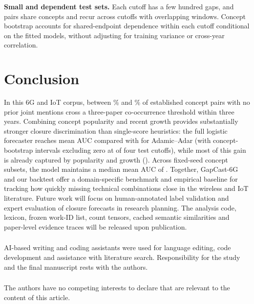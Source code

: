 \documentclass[runningheads]{llncs}
\newcommand{\bench}{GapCast-6G}
\begin{document}
\textbf{Small and dependent test sets.} Each cutoff has a few hundred gaps, and pairs share concepts and recur across cutoffs with overlapping windows. Concept bootstrap accounts for shared-endpoint dependence within each cutoff conditional on the fitted models, without adjusting for training variance or cross-year correlation.

\section{Conclusion}

In this 6G and IoT corpus, between \fillMin{}\% and \fillMax{}\% of established concept pairs with no prior joint mentions cross a three-paper co-occurrence threshold within three years. Combining concept popularity and recent growth provides substantially stronger closure discrimination than single-score heuristics: the full logistic forecaster reaches mean AUC \learnedAUC{} compared with \aaAUC{} for Adamic--Adar (with concept-bootstrap intervals excluding zero at \ciClAaExcludeW{} of four test cutoffs), while most of this gain is already captured by popularity and growth (\lrpgAUC{}). Across \subN{} fixed-seed concept subsets, the model maintains a median mean AUC of \subLearnedMed{}. Together, \bench{} and our backtest offer a domain-specific benchmark and empirical baseline for tracking how quickly missing technical combinations close in the wireless and IoT literature. Future work will focus on human-annotated label validation and expert evaluation of closure forecasts in research planning. The analysis code, lexicon, frozen work-ID list, count tensors, cached semantic similarities and paper-level evidence traces will be released upon publication.

\begin{credits}
\subsubsection{\ackname} AI-based writing and coding assistants were used for language editing, code development and assistance with literature search. Responsibility for the study and the final manuscript rests with the authors.

\subsubsection{\discintname}
The authors have no competing interests to declare that are relevant to the content of this article.
\end{credits}



\end{document}
